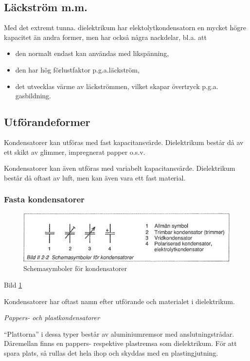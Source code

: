 \subsection{Läckström m.m.}

Med det extremt tunna. dielektrikum har elektolytkondensatorn en mycket högre
kapacitet än andra former, men har också några nackdelar, bl.a. att
\begin{itemize}
  \item den normalt endast kan användas med likspänning,
  \item den har hög förlustfaktor p.g.a.läckström,
  \item det utvecklas värme av läckströmmen, vilket skapar övertryck p.g.a.
    gasbildning.
\end{itemize}


\subsection{Utförandeformer}

Kondensatorer kan utföras med fast kapacitansvärde. Dielektrikum består då av
ett skikt av glimmer, impregnerat papper o.s.v.

Kondensatorer kan även utföras med variabelt kapacitansvärde. Dielektrikum
består då oftast av luft, men kan även vara ett fast material.

\subsubsection{Fasta kondensatorer}

\begin{figure}
\includegraphics[width=\textwidth]{images/bild_2_2-02}
\caption{Schemasymboler för kondensatorer}
\label{fig:BildII2-2}
\end{figure}

Bild \ref{fig:BildII2-2}

Kondensatorer har oftast namn efter utförande och materialet i dielektrikum.

\emph{Pappers- och plastkondensatorer}

``Plattorna'' i dessa typer består av aluminiumremsor med anslutningstrådar.
Däremellan finns en pappers- respektive plastremsa som dielektrikum. För att
spara plats, så rullas det hela ihop och skyddas med en plastingjutning.

